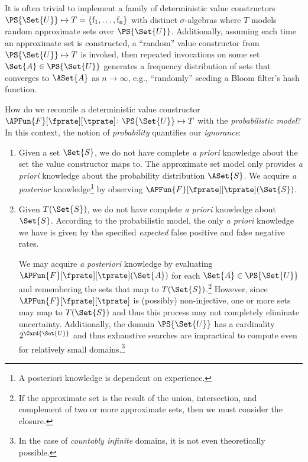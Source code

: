 \documentclass[ ../main.tex]{subfiles}
\newcommand{\ctor}[2]{\APFun{F}[#1][#2]}
\begin{document}

\begin{remark}
It is often trivial to implement a family of deterministic value constructors $\PS{\Set{U}} \mapsto T = \{\operatorname{f_1},\ldots,\operatorname{f_n}\}$ with distinct $\sigma$-algebras where $T$ models random approximate sets over $\PS{\Set{U}}$.
Additionally, assuming each time an approximate set is constructed, a ``random'' value constructor from $\PS{\Set{U}} \mapsto T$ is invoked, then repeated invocations on some set $\Set{A} \in \PS{\Set{U}}$ generates a frequency distribution of sets that converges to $\ASet{A}$ as $n \to \infty$, e.g., ``randomly'' seeding a Bloom filter's hash function.
\end{remark}

How do we reconcile a deterministic value constructor $\ctor{\fprate}{\tprate} \colon \PS{\Set{U}} \mapsto T$ with the \emph{probabilistic model}?
In this context, the notion of \emph{probability} quantifies our \emph{ignorance}:
\begin{enumerate}
\item Given a set $\Set{S}$, we do not have complete \emph{a priori} knowledge about the set the value constructor maps to.
The approximate set model only provides \emph{a priori} knowledge about the probability distribution $\ASet{S}$.
We acquire \emph{a posterior} knowledge\footnote{A posteriori knowledge is dependent on experience.} by observing $\ctor{\fprate}{\tprate}(\Set{S})$.

\item Given $T(\Set{S})$, we do not have complete \emph{a priori} knowledge about $\Set{S}$.
According to the probabilistic model, the only \emph{a priori} knowledge we have is given by the specified \emph{expected} false positive and false negative rates.

We may acquire \emph{a posteriori} knowledge by evaluating $\ctor{\fprate}{\tprate}(\Set{A})$ for each $\Set{A} \in \PS{\Set{U}}$ and remembering the sets that map to $T(\Set{S})$.\footnote{If the approximate set is the result of the union, intersection, and complement of two or more approximate sets, then we must consider the closure.}
However, since $\ctor{\fprate}{\tprate}$ is (possibly) non-injective, one or more sets may map to $T(\Set{S})$ and thus this process may not completely eliminate uncertainty.
Additionally, the domain $\PS{\Set{U}}$ has a cardinality $2^{\Card{\Set{U}}}$ and thus exhaustive searches are impractical to compute even for relatively small domains.\footnote{In the case of \emph{countably infinite} domains, it is not even theoretically possible.}
\end{enumerate}
\end{document}
